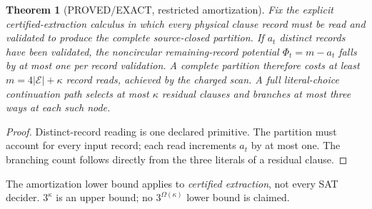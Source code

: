 \documentclass[11pt]{article}
\newtheorem{theorem}{Theorem}
\begin{document}
\begin{theorem}[PROVED/EXACT, restricted amortization]
Fix the explicit certified-extraction calculus in which every physical clause record must be read and validated to produce the complete source-closed partition. If $a_t$ distinct records have been validated, the noncircular remaining-record potential $\Phi_t=m-a_t$ falls by at most one per record validation. A complete partition therefore costs at least $m=4|\mathcal E|+\kappa$ record reads, achieved by the charged scan. A full literal-choice continuation path selects at most $\kappa$ residual clauses and branches at most three ways at each such node.
\end{theorem}
\begin{proof}
Distinct-record reading is one declared primitive. The partition must account for every input record; each read increments $a_t$ by at most one. The branching count follows directly from the three literals of a residual clause.
\end{proof}
The amortization lower bound applies to \emph{certified extraction}, not every SAT decider. $3^\kappa$ is an upper bound; no $3^{\Omega(\kappa)}$ lower bound is claimed.
\end{document}
